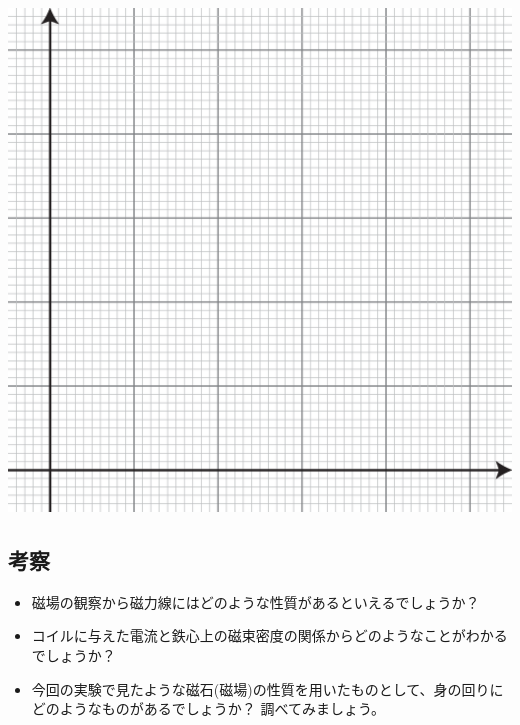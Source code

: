 \bigskip

\hspace*{-\parindent}
\includegraphics[scale=0.83]{06_Magnetism/graph.eps}

\newpage

\subsection*{考察}

\begin{itemize}

\item 磁場の観察から磁力線にはどのような性質があるといえるでしょうか？

\vspace{6cm}

\item コイルに与えた電流と鉄心上の磁束密度の関係からどのようなことがわかるでしょうか？

\vspace{6cm}

\item 今回の実験で見たような磁石(磁場)の性質を用いたものとして、身の回りにどのようなものがあるでしょうか？ 調べてみましょう。

\end{itemize}
